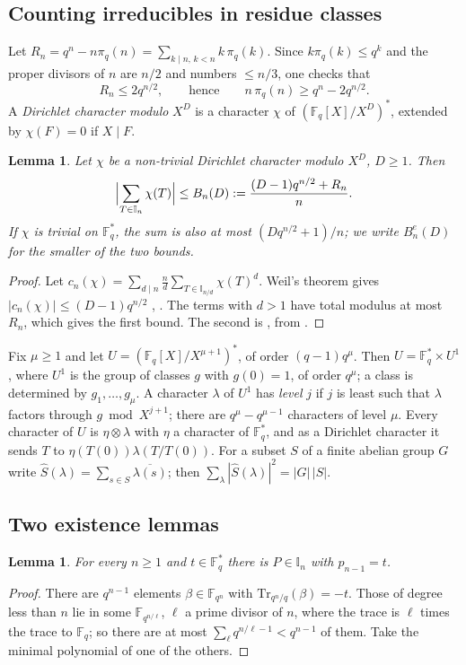 \documentclass[11pt,a4paper]{amsart}
\newtheorem{lemma}[theorem]{Lemma}
\theoremstyle{remark}
\newcommand{\F}{\mathbb{F}}
\newcommand{\Fq}{\mathbb{F}_q}
\newcommand{\Tr}{\mathrm{Tr}}
\newcommand{\I}{\mathbb{I}}
\begin{document}
\subsection{Counting irreducibles in residue classes}
Let $R_n=q^n-n\pi_q(n)=\sum_{k\mid n,\,k<n}k\,\pi_q(k)$. Since $k\pi_q(k)\le q^k$ and the proper divisors of
$n$ are $n/2$ and numbers $\le n/3$, one checks that
\begin{equation}\label{eq:Rn}
R_n\le2q^{n/2},\qquad\text{hence}\qquad n\,\pi_q(n)\ge q^n-2q^{n/2}.
\end{equation}
A \emph{Dirichlet character modulo} $X^D$ is a character $\chi$ of $(\Fq[X]/X^D)^*$, extended by $\chi(F)=0$ if
$X\mid F$.

\begin{lemma}\label{lem:weil}
Let $\chi$ be a non-trivial Dirichlet character modulo $X^D$, $D\ge1$. Then
\[
\Bigl|\sum_{T\in\I_n}\chi(T)\Bigr|\le B_n(D):=\frac{(D-1)q^{n/2}+R_n}{n}.
\]
If $\chi$ is trivial on $\Fq^*$, the sum is also at most $(Dq^{n/2}+1)/n$; we write $B^e_n(D)$ for the smaller of
the two bounds.
\end{lemma}
\begin{proof}
Let $c_n(\chi)=\sum_{d\mid n}\frac nd\sum_{T\in\I_{n/d}}\chi(T)^d$. Weil's theorem gives
$|c_n(\chi)|\le(D-1)q^{n/2}$ \cite[Theorem~2.5]{K}, \cite[Ch.~4]{Ro}. The terms with $d>1$ have total modulus at
most $R_n$, which gives the first bound. The second is \cite[Proposition~2.6]{K}, from \cite[Corollary~2.8]{Wa}.
\end{proof}

Fix $\mu\ge1$ and let $U=(\Fq[X]/X^{\mu+1})^*$, of order $(q-1)q^\mu$. Then $U=\Fq^*\times U^1$, where $U^1$ is
the group of classes $g$ with $g(0)=1$, of order $q^\mu$; a class is determined by $g_1,\dots,g_\mu$. A
character $\lambda$ of $U^1$ has \emph{level} $j$ if $j$ is least such that $\lambda$ factors through
$g\bmod X^{j+1}$; there are $q^\mu-q^{\mu-1}$ characters of level $\mu$. Every character of $U$ is
$\eta\otimes\lambda$ with $\eta$ a character of $\Fq^*$, and as a Dirichlet character it sends $T$ to
$\eta(T(0))\lambda(T/T(0))$. For a subset $S$ of a finite abelian group $G$ write
$\widehat S(\lambda)=\sum_{s\in S}\overline{\lambda(s)}$; then $\sum_\lambda|\widehat S(\lambda)|^2=|G|\,|S|$.

\subsection{Two existence lemmas}

\begin{lemma}\label{lem:trace}
For every $n\ge1$ and $t\in\Fq^*$ there is $P\in\I_n$ with $p_{n-1}=t$.
\end{lemma}
\begin{proof}
There are $q^{n-1}$ elements $\beta\in\F_{q^n}$ with $\Tr_{q^n/q}(\beta)=-t$. Those of degree less than $n$ lie
in some $\F_{q^{n/\ell}}$, $\ell$ a prime divisor of $n$, where the trace is $\ell$ times the trace to $\Fq$; so
there are at most $\sum_\ell q^{n/\ell-1}<q^{n-1}$ of them. Take the minimal polynomial of one of the others.
\end{proof}
\end{document}
